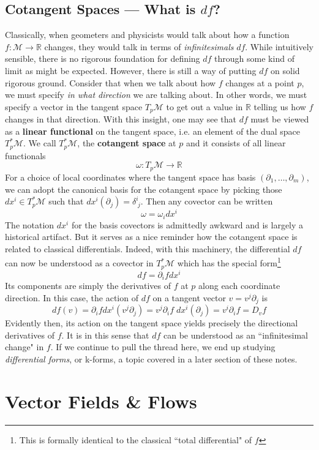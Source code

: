 \documentclass[onecolumn]{gwclass}
\newcommand{\man}{\mathcal{M}}
\newcommand{\R}{\mathbb{R}}
\begin{document}
	
	\subsection{Cotangent Spaces --- What is $df$?}
	Classically, when geometers and physicists would talk about how a function $f:\man\to\R$ changes, they would talk in terms of \emph{infinitesimals} $df$. While intuitively sensible, there is no rigorous foundation for defining $df$ through some kind of limit as might be expected. However, there is still a way of putting $df$ on solid rigorous ground. Consider that when we talk about how $f$ changes at a point $p$, we must specify \emph{in what direction} we are talking about. In other words, we must specify a vector in the tangent space $T_p\man$ to get out a value in $\R$ telling us how $f$ changes in that direction. With this insight, one may see that $df$ must be viewed as a \textbf{linear functional} on the tangent space, i.e. an element of the dual space $T_p^*\man$. We call $T_p^*\man$, the \textbf{cotangent space} at $p$ and it consists of all linear functionals
	 $$\omega:T_p\man\to\mathbb{R}$$
	For a choice of local coordinates where the tangent space has basis $(\partial_1,\dots,\partial_m)$, we can adopt the canonical basis for the cotangent space by picking those $dx^i\in T_p^*\man$ such that $dx^i(\partial_j)=\delta^i_{\;j}$. Then any covector can be written
	$$ \omega = \omega_i dx^i $$
	The notation $dx^i$ for the basis covectors is admittedly awkward and is largely a historical artifact. But it serves as a nice reminder how the cotangent space is related to classical differentials. Indeed, with this machinery, the differential $df$ can now be understood as a covector in $T_p^*\man$ which has the special form\footnote{ This is formally identical to the classical ``total differential" of $f$}
	$$df = \partial_i f dx^i$$
	Its components are simply the derivatives of $f$ at $p$ along each coordinate direction. In this case, the action of $df$ on a tangent vector $v=v^j\partial_j$ is 
	$$ df(v) = \partial_i f dx^i(v^j\partial_j) = v^j\partial_i f \;dx^i(\partial_j) = v^i\partial_i f = D_v f$$
	Evidently then, its action on the tangent space yields precisely the directional derivatives of $f$. It is in this sense that $df$ can be understood as an ``infinitesimal change" in $f$. If we continue to pull the thread here, we end up studying \emph{differential forms}, or k-forms, a topic covered in a later section of these notes.
	
	
	\section{Vector Fields \& Flows}
	
\end{document}
